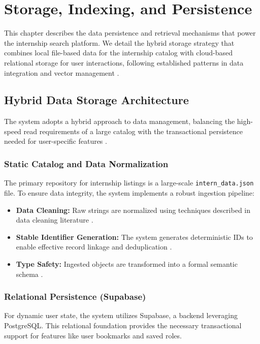 \chapter{Storage, Indexing, and Persistence}
This chapter describes the data persistence and retrieval mechanisms that power the internship search platform. We detail the hybrid storage strategy that combines local file-based data for the internship catalog with cloud-based relational storage for user interactions, following established patterns in data integration and vector management \cite{doan2012principles, wang2021milvus}.

\section{Hybrid Data Storage Architecture}
The system adopts a hybrid approach to data management, balancing the high-speed read requirements of a large catalog with the transactional persistence needed for user-specific features \cite{doan2012principles}.

\subsection{Static Catalog and Data Normalization}
The primary repository for internship listings is a large-scale \texttt{intern\_data.json} file. To ensure data integrity, the system implements a robust ingestion pipeline:
\begin{itemize}
    \item \textbf{Data Cleaning:} Raw strings are normalized using techniques described in data cleaning literature \cite{chu2016data}.
    \item \textbf{Stable Identifier Generation:} The system generates deterministic IDs to enable effective record linkage and deduplication \cite{christen2012data, elmagarmid2007duplicate}.
    \item \textbf{Type Safety:} Ingested objects are transformed into a formal semantic schema \cite{sarawagi2008information}.
\end{itemize}

\subsection{Relational Persistence (Supabase)}
For dynamic user state, the system utilizes Supabase, a backend leveraging PostgreSQL. This relational foundation provides the necessary transactional support for features like user bookmarks and saved roles.

